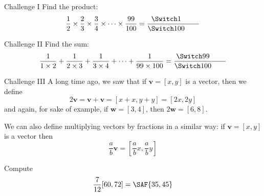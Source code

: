 \documentclass[12pt,letterpaper]{article}
\begin{document}
\begin{problem}{Challenge I}
 Find the product:
 \[
  \frac{1}{2} \times \frac{2}{3} \times \frac{3}{4} \times
  \dots \times \frac{99}{100} = \fracans{1}{100}
 \]
\end{problem}

\begin{problem}{Challenge II}
 Find the sum:
 \[
  \frac{1}{1 \times 2} + \frac{1}{2 \times 3} + \frac{1}{3 \times 4}
  + \dots + \frac{1}{99 \times 100} = \fracans{99}{100}
 \]
\end{problem}

\begin{problem}{Challenge III}
  A long time ago, we saw that if \(\mathbf{v} = [x, y]\) is a vector, then we
  define \[
    2\mathbf{v} = \mathbf{v} + \mathbf{v} = [x + x, y + y] = [2x, 2y]
  \] and again, for sake of example, if \(\mathbf{w} = [3, 4]\), then
  \(2\mathbf{w} = [6, 8]\).

  We can also define multiplying vectors by fractions in a similar way: if
  \(\mathbf{v} = [x, y]\) is a vector then \[
    \frac{a}{b} \mathbf{v} = \left[\frac{a}{b}x, \frac{a}{b}y\right]
  \]

  Compute \[
    \frac{7}{12} [60, 72] = \SAF{35, 45}
  \]
\end{problem}
\end{document}
